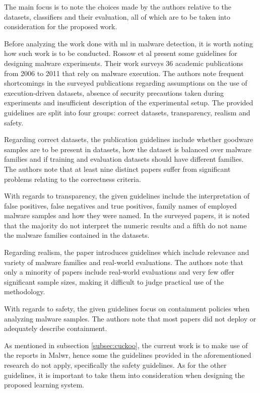\documentclass{llncs}
\begin{document}
The main focus is to note the choices made by the authors relative to the datasets, classifiers and their evaluation, all of which are to be taken into consideration for the proposed work.

Before analyzing the work done with \gls{ml} in malware detection, it is worth noting how such work is to be conducted. Rossow et al\cite{rossow:practices} present some guidelines for designing malware experiments. Their work surveys 36 academic publications from 2006 to 2011 that rely on malware execution. The authors note frequent shortcomings in the surveyed publications regarding assumptions on the use of execution-driven datasets, absence of security precautions taken during experiments and insufficient description of the experimental setup. The provided guidelines are split into four groups: correct datasets, transparency, realism and safety.

Regarding correct datasets, the publication guidelines include whether goodware samples are to be present in datasets, how the dataset is balanced over malware families and if training and evaluation datasets should have different families. The authors note that at least nine distinct papers suffer from significant problems relating to the correctness criteria.

With regards to transparency, the given guidelines include the interpretation of false positives, false negatives and true positives, family names of employed malware samples and how they were named. In the surveyed papers, it is noted that the majority do not interpret the numeric results and a fifth do not name the malware families contained in the datasets.

Regarding realism, the paper introduces guidelines which include relevance and variety of malware families and real-world evaluations. The authors note that only a minority of papers include real-world evaluations and very few offer significant sample sizes, making it difficult to judge practical use of the methodology.

With regards to safety, the given guidelines focus on containment policies when analyzing malware samples. The authors note that most papers did not deploy or adequately describe containment.

As mentioned in subsection \ref{subsec:cuckoo}, the current work is to make use of the reports in Malwr, hence some the guidelines provided in the aforementioned research do not apply, specifically the safety guidelines. As for the other guidelines, it is important to take them into consideration when designing the proposed learning system.
\end{document}

